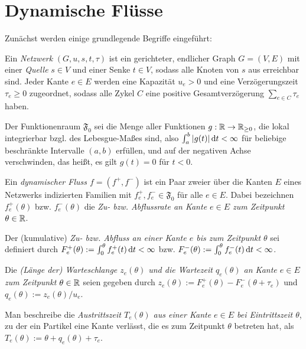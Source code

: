 \chapter{Dynamische Flüsse}\label{sec-dynamic-flows}

Zunächst werden einige grundlegende Begriffe eingeführt:

\begin{definition}[Netzwerk]
	Ein \emph{Netzwerk} $(G, u, s, t, \tau)$ ist ein gerichteter, endlicher Graph $G=(V,E)$ mit einer \emph{Quelle} $s\in V$ und einer Senke $t\in V$, sodass alle Knoten von $s$ aus erreichbar sind.
	Jeder Kante $e\in E$ werden eine Kapazität $u_e > 0$ und eine Verzögerungszeit $\tau_e\geq 0$ zugeordnet, sodass alle Zykel $C$ eine positive Gesamtverzögerung $\sum_{e\in C}\tau_e$ haben.
\end{definition}

\begin{definition}
	Der Funktionenraum $\mathfrak{F}_0$ sei die Menge aller Funktionen $g: \mathbb{R} \to \mathbb{R}_{\geq 0}$, die lokal integrierbar bzgl. des Lebesgue-Maßes sind, also $\int_a^b |g(t)| \mathop{}\!\mathrm{d} t< \infty$ für beliebige beschränkte Intervalle $(a,b)$ erfüllen, und auf der negativen Achse verschwinden, das heißt, es gilt $g(t)=0$ für $t<0$.
\end{definition}

\begin{definition}
	Ein \emph{dynamischer Fluss $f=(f^+, f^-)$} ist ein Paar zweier über die Kanten $E$ eines Netzwerks indizierten Familien mit $f^+_e,f^-_e\in\mathfrak F_0$ für alle $e\in E$.
	Dabei bezeichnen $f_e^+(\theta)$ bzw. $f_e^-(\theta)$ die \emph{Zu- bzw. Abflussrate an Kante $e\in E$ zum Zeitpunkt $\theta\in\mathbb{R}$}.
	
	Der (kumulative) \emph{Zu- bzw. Abfluss an einer Kante $e$ bis zum Zeitpunkt $\theta$} sei definiert durch $F^+_e(\theta):=\int_0^\theta f^+_e(t) \mathop{}\!\mathrm{d} t<\infty$ bzw. $F^-_e(\theta):=\int_0^\theta f^-_e(t) \mathop{}\!\mathrm{d} t<\infty$.
	
	Die \emph{(Länge der) Warteschlange $z_e(\theta)$ und die Wartezeit $q_e(\theta)$ an Kante $e\in E$ zum Zeitpunkt $\theta\in\mathbb{R}$} seien gegeben durch $z_e(\theta):= F_e^+(\theta) - F_e^-(\theta + \tau_e)$ und $q_e(\theta) := z_e(\theta) / u_e$.
	
	Man beschreibe die \emph{Austrittszeit $T_e(\theta)$ aus einer Kante $e\in E$ bei Eintrittszeit $\theta$}, zu der ein Partikel eine Kante verlässt, die es zum Zeitpunkt $\theta$ betreten hat, als $T_e(\theta):=\theta + q_e(\theta) + \tau_e$.
\end{definition}

